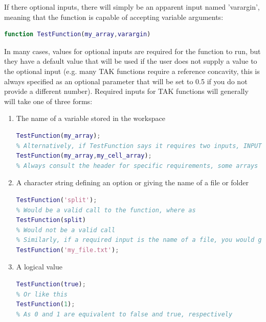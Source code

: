 \noindent
If there optional inputs, there will simply be an apparent input named 'varargin', meaning that the function is capable of accepting variable arguments:

\begin{lstlisting}[language=Matlab]
% A function definition with one required input and an arbitrary number of optional inputs
function TestFunction(my_array,varargin)
\end{lstlisting}

\noindent 
In many cases, values for optional inputs are required for the function to run, but they have a default value that will be used if the user does not supply a value to the optional input (e.g. many TAK functions require a reference concavity, this is always specified as an optional parameter that will be set to 0.5 if you do not provide a different number). Required inputs for TAK functions will generally will take one of three forms: 

\begin{enumerate}
	\item The name of a variable stored in the workspace
\begin{lstlisting}[language=Matlab]
% The header of TestFunction tells you that it has one required input that is a Matlab array named INPUT, this means you can provide any Matlab array (with any name) to TestFunction
TestFunction(my_array);
% Alternatively, if TestFunction says it requires two inputs, INPUT1 and INPUT2, i.e. the help pop up looks like TestFunction(INPUT1,INPUT2), and the first input is supposed to be a Matlab array and the second is supposed to be a Matlab cell array, then a valid input would be
TestFunction(my_array,my_cell_array);
% Always consult the header for specific requirements, some arrays have restrictions on their dimensions, e.g. they must be an n x 2 array. Inputs to TAK functions will be 'parsed' so if they do not meet the requirements, you will be informed of this and the function will error out
\end{lstlisting}	
	\item A character string defining an option or giving the name of a file or folder
\begin{lstlisting}[language=Matlab]
% The header of TestFunction tells you it requires one input Method that defines a method and that the valid inputs to method are 'split' or 'join', so
TestFunction('split');
% Would be a valid call to the function, where as
TestFunction(split)
% Would not be a valid call
% Similarly, if a required input is the name of a file, you would give these in single quotes 
TestFunction('my_file.txt');
\end{lstlisting}
	\item A logical value
\begin{lstlisting}[language=Matlab]
% The header of TestFunction tells you that it has one required input, Do_X and that this expects a logical value, then you could call it like this
TestFunction(true);
% Or like this
TestFunction(1);
% As 0 and 1 are equivalent to false and true, respectively
\end{lstlisting}	
	
\end{enumerate}

